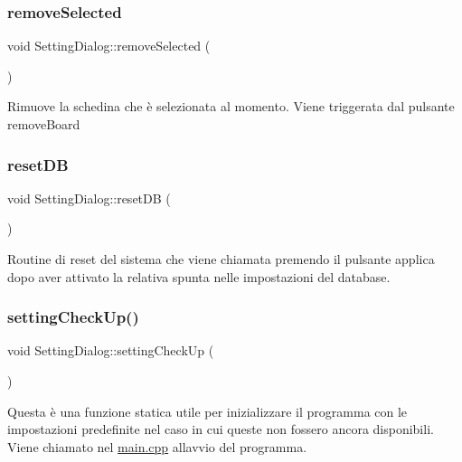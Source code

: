 \subsubsection{\texorpdfstring{remove\+Selected}{removeSelected}}
{\footnotesize\ttfamily void Setting\+Dialog\+::remove\+Selected (\begin{DoxyParamCaption}{ }\end{DoxyParamCaption})\hspace{0.3cm}{\ttfamily [slot]}}

Rimuove la schedina che è selezionata al momento. Viene triggerata dal pulsante {\ttfamily remove\+Board} \mbox{\label{class_setting_dialog_a0f0752ea8686805bade1dabe9cbc64b2}} 
\subsubsection{\texorpdfstring{reset\+DB}{resetDB}}
{\footnotesize\ttfamily void Setting\+Dialog\+::reset\+DB (\begin{DoxyParamCaption}{ }\end{DoxyParamCaption})\hspace{0.3cm}{\ttfamily [slot]}}

Routine di reset del sistema che viene chiamata premendo il pulsante applica dopo aver attivato la relativa spunta nelle impostazioni del database. \mbox{\label{class_setting_dialog_a518a4582b5e8837449b71c9af6e0a8b8}} 
\subsubsection{\texorpdfstring{setting\+Check\+Up()}{settingCheckUp()}}
{\footnotesize\ttfamily void Setting\+Dialog\+::setting\+Check\+Up (\begin{DoxyParamCaption}{ }\end{DoxyParamCaption})\hspace{0.3cm}{\ttfamily [static]}}

Questa è una funzione statica utile per inizializzare il programma con le impostazioni predefinite nel caso in cui queste non fossero ancora disponibili. Viene chiamato nel {\ttfamily \hyperlink{main_8cpp}{main.\+cpp}} all\textquotesingle{}avvio del programma. \mbox{\label{class_setting_dialog_af0469277c1c7cbb9d39f763d4dacb8c6}} 
